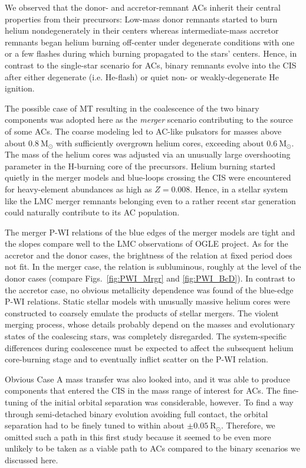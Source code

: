 \documentclass[a4paper,fleqn,usenatbib]{mnras}
\newcommand{\msol}{~\mathrm{M}_\odot}
\newcommand{\rsol}{~\mathrm{R}_\odot}
\begin{document}
We observed that the donor- and accretor-remnant ACs inherit their central properties 
from their precursors: Low-mass donor remnants started to burn helium nondegenerately 
in their centers whereas intermediate-mass  accretor remnants began helium burning off-center 
under degenerate conditions with one or a few flashes during which burning propagated to the 
stars' centers. Hence, in contrast to the single-star scenario for ACs,
binary remnants evolve into the CIS after either degenerate (i.e. He-flash)
or quiet non- or weakly-degenerate He ignition.

The possible case of 
MT resulting in the coalescence of the two binary components was adopted here 
as the \emph{merger} scenario contributing to the source of some ACs. The coarse modeling led
to AC-like pulsators for masses above about $0.8 \msol$ with sufficiently overgrown helium cores, 
exceeding about $0.6 \msol$. The mass of the helium cores was adjusted via an unusually large
overshooting parameter in the H-burning core of the precursors. Helium burning started quietly
in the merger models and blue-loops crossing the CIS were encountered for heavy-element abundances 
as high as $Z=0.008$. Hence, in a stellar system like the LMC merger remnants belonging even to a 
rather recent star generation could naturally contribute to its AC population.

The merger P-WI relations of the blue edges of the merger models are tight and the slopes
compare well to the LMC observations of OGLE project. As for the accretor and the donor cases, the
brightness of the relation at fixed period does not fit. In the merger case, 
the relation is subluminous, roughly at the level of the donor 
cases (compare Figs.~\ref{fig:PWI_Mrgr} and \ref{fig:PWI_BcD}).
In contrast to the accretor case, no obvious metallicity dependence was found of the blue-edge P-WI
relations. Static stellar models with unusually massive helium cores were constructed to
coarsely emulate the products of stellar mergers. 
The violent merging process, whose details probably depend on the masses and evolutionary 
states of the coalescing stars, was completely disregarded.
The system-specific differences during coalescence must be expected to affect the subsequent 
helium core-burning stage and to eventually inflict scatter on the P-WI relation.

Obvious Case A mass transfer was also looked into, and it was able to produce 
components that entered the CIS in the mass range of interest for ACs. The fine-tuning of the 
initial orbital separation was considerable, however. To find a way through semi-detached
binary evolution avoiding full contact, the orbital separation 
had to be finely tuned to within about $\pm 0.05 \rsol$. Therefore, we omitted such a path in this
first study because it seemed to be even more unlikely 
to be taken as a viable path to ACs compared to the binary scenarios we discussed here.
\end{document}
